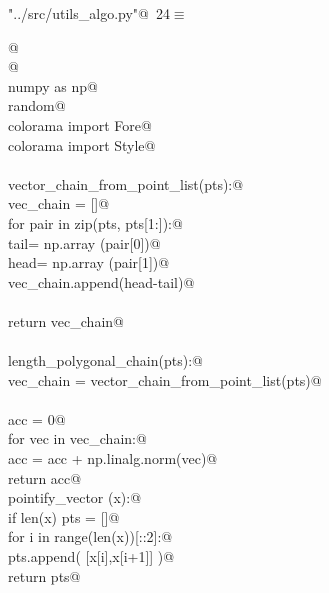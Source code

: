 \documentclass[10.0pt]{report}
\begin{document}
\begin{appendices}
\begin{flushleft} \small\label{scrap10}\raggedright\small
{} \verb@"../src/utils_algo.py"@\nobreak\ {\footnotesize {24}}$\equiv$
\vspace{-1ex}
\begin{list}{}{} \item
\mbox{}\verb@    @\\
\mbox{}\verb@ @\\
\mbox{}\verb@import numpy as np@\\
\mbox{}\verb@import random@\\
\mbox{}\verb@from colorama import Fore@\\
\mbox{}\verb@from colorama import Style@\\
\mbox{}\verb@@\\
\mbox{}\verb@def vector_chain_from_point_list(pts):@\\
\mbox{}\verb@    vec_chain = []@\\
\mbox{}\verb@    for pair in zip(pts, pts[1:]):@\\
\mbox{}\verb@        tail= np.array (pair[0])@\\
\mbox{}\verb@        head= np.array (pair[1])@\\
\mbox{}\verb@        vec_chain.append(head-tail)@\\
\mbox{}\verb@@\\
\mbox{}\verb@    return vec_chain@\\
\mbox{}\verb@@\\
\mbox{}\verb@def length_polygonal_chain(pts):@\\
\mbox{}\verb@    vec_chain = vector_chain_from_point_list(pts)@\\
\mbox{}\verb@@\\
\mbox{}\verb@    acc = 0@\\
\mbox{}\verb@    for vec in vec_chain:@\\
\mbox{}\verb@        acc = acc + np.linalg.norm(vec)@\\
\mbox{}\verb@    return acc@\\
\mbox{}\verb@def pointify_vector (x):@\\
\mbox{}\verb@    if len(x) % 2 == 0:@\\
\mbox{}\verb@        pts = []@\\
\mbox{}\verb@        for i in range(len(x))[::2]:@\\
\mbox{}\verb@            pts.append( [x[i],x[i+1]] )@\\
\mbox{}\verb@        return pts@\\

\end{list}
\end{flushleft}
\end{appendices}
\end{document}
